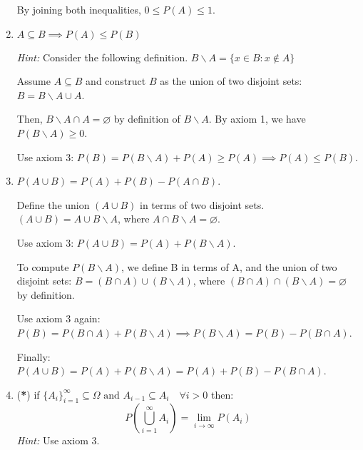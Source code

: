 \begin{enumerate}[label=\alph*.]
By joining both inequalities, $0 \leq P(A) \leq 1$.

    \item $A \subseteq B \implies P(A) \leq P(B)$
    
    \textit{Hint:} Consider the following definition. $B\backslash  A = \{x\in B: x\notin A\}$

Assume $A \subseteq B$ and construct $B$ as the union of two disjoint sets: $B = B\backslash A \cup A$.

Then, $B\backslash A \cap A = \varnothing$ by definition of $B\backslash A$. By axiom 1, we have $P(B\backslash A) \geq 0$. 

Use axiom 3: $P(B) = P(B\backslash A) + P(A) \geq P(A) \implies P(A) \leq P(B)$.


    \item $P(A\cup B) = P(A) + P(B) - P(A\cap B)$.

Define the union $(A\cup B)$ in terms of two disjoint sets. $(A \cup B) = A \cup B\backslash A$, where $A \cap B\backslash A = \varnothing$. 

Use axiom 3: $P(A \cup B) = P(A) + P(B\backslash A)$.

To compute $P(B\backslash A)$, we define B in terms of A, and the union of two disjoint sets: $B = (B \cap A) \cup (B\backslash A)$, where $(B \cap A) \cap (B\backslash A) = \varnothing$ by definition. 

Use axiom 3 again: $P(B) = P(B \cap A) + P(B\backslash A) \implies P(B\backslash A) = P(B) - P(B \cap A)$.

Finally: $P(A \cup B) = P(A) + P(B\backslash A) = P(A) + P(B) - P(B \cap A)$.

    \item (\textbf{*}) if $\{A_i\}_{i=1}^\infty \subseteq \Omega \text{ and } A_{i-1} \subseteq A_{i}\quad \forall i>0$ then:
\[
P\left(\bigcup_{i=1}^{\infty} A_{i}\right) = \lim_{i\xrightarrow{}\infty} P(A_i)
\]
\textit{Hint:} Use axiom 3.


\end{enumerate}
